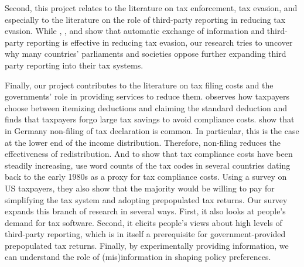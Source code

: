 \documentclass[12pt]{article}
\begin{document}
Second, this project relates to the literature on tax enforcement, tax evasion, and especially to the literature on the role of third-party reporting in reducing tax evasion. While \textcite{kleven2011unwilling}, \textcite{pomeranz2015no}, \textcite{slemrod2017does} and \textcite{boas2024taxing} show that automatic exchange of information and third-party reporting is effective in reducing tax evasion, our research tries to uncover why many countries' parliaments and societies oppose further expanding third party reporting into their tax systems. 

Finally, our project contributes to the literature on tax filing costs and the governments' role in providing services to reduce them. \textcite{benzarti2020taxing} observes how taxpayers choose between itemizing deductions and claiming the standard deduction and finds that taxpayers forgo large tax savings to avoid compliance costs. \textcite{hauck2024optional} show that in Germany non-filing of tax declaration is common. In particular, this is the case at the lower end of the income distribution. Therefore, non-filing reduces the effectiveness of redistribution. And to show that tax compliance costs have been steadily increasing, \textcite{benzarti2024rising} use word counts of the tax codes in several countries dating back to the early 1980s as a proxy for tax compliance costs. Using a survey on US taxpayers, they also show that the majority would be willing to pay for simplifying the tax system and adopting prepopulated tax returns. Our survey expands this branch of research in several ways. First, it also looks at people's demand for tax software. Second, it elicits people's views about high levels of third-party reporting, which is in itself a prerequisite for government-provided prepopulated tax returns. Finally, by experimentally providing information, we can understand the role of (mis)information in shaping policy preferences. 
\newpage
\printbibliography
\end{document}

